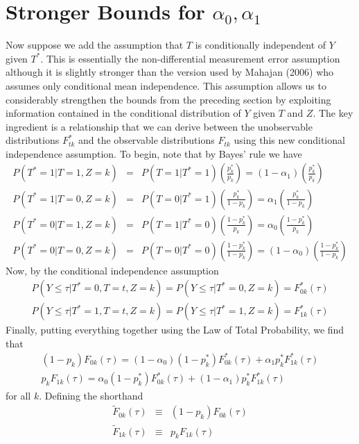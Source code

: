 \documentclass[12pt]{article}
\begin{document}
\section{Stronger Bounds for $\alpha_0, \alpha_1$}
Now suppose we add the assumption that $T$ is conditionally independent of $Y$ given $T^*$. 
This is essentially the non-differential measurement error assumption although it is slightly stronger than the version used by Mahajan (2006) who assumes only conditional mean independence.
This assumption allows us to considerably strengthen the bounds from the preceding section by exploiting information contained in the conditional distribution of $Y$ given $T$ and $Z$.
The key ingredient is a relationship that we can derive between the unobservable distributions $F_{tk}^*$ and the observable distributions $F_{tk}$ using this new conditional independence assumption.
To begin, note that by Bayes' rule we have
\begin{eqnarray*}
  P(T^*=1|T=1, Z=k) &=& P(T=1 | T^*=1) \left(\frac{p_k^*}{p_k}\right) = (1 - \alpha_1)\left( \frac{p_k^*}{p_k} \right)\\
  P(T^*=1|T=0, Z=k) &=& P(T=0 | T^*=1) \left(\frac{p_k^*}{1 - p_k}\right) = \alpha_1 \left( \frac{p_k^*}{1 - p_k} \right)\\
  P(T^*=0|T=1, Z=k) &=& P(T=1 | T^*=0) \left(\frac{1 - p_k^*}{p_k}\right) = \alpha_0 \left( \frac{1 - p_k^*}{p_k} \right)\\
  P(T^*=0|T=0, Z=k) &=& P(T=0 | T^*=0) \left(\frac{1 - p_k^*}{1 - p_k}\right) = (1 - \alpha_0)\left( \frac{1 - p_k^*}{1 - p_k} \right)
\end{eqnarray*}
Now, by the conditional independence assumption
\begin{eqnarray*}
  P(Y\leq \tau|T^* = 0, T=t , Z = k) = P(Y \leq \tau|T^*=0, Z =k) = F_{0k}^*(\tau)\\
  P(Y\leq \tau|T^* = 1, T=t , Z = k) = P(Y \leq \tau|T^*=1, Z =k) = F_{1k}^*(\tau)
\end{eqnarray*}
Finally, putting everything together using the Law of Total Probability, we find that
\begin{eqnarray*}
  (1 - p_k) F_{0k}(\tau) = (1 - \alpha_0) (1 - p^*_k)F_{0k}^*(\tau) + \alpha_1 p_k^* F_{1k}^*(\tau)\\ 
  p_k F_{1k}(\tau) = \alpha_0 (1 - p_k^*) F_{0k}^*(\tau) + (1 - \alpha_1)p_k^* F_{1k}^*(\tau)
\end{eqnarray*}
for all $k$.
Defining the shorthand 
\begin{eqnarray*}
  \widetilde{F}_{0k}(\tau)&\equiv& (1 - p_k) F_{0k}(\tau) \\
  \widetilde{F}_{1k}(\tau) &\equiv& p_k F_{1k}(\tau) 
\end{eqnarray*}
\end{document}
